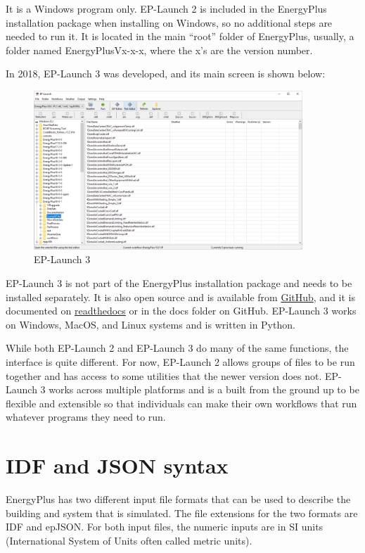It is a Windows program only. EP-Launch 2 is included in the EnergyPlus
installation package when installing on Windows, so no additional
steps are needed to run it. It is located in the main ``root'' folder
of EnergyPlus, usually, a folder named EnergyPlusVx-x-x, where the
x's are the version number. 

In 2018, EP-Launch 3 was developed, and its main screen is shown below:

\begin{figure}[hbtp] 
\centering
\includegraphics[width=0.9\textwidth, height=0.9\textheight, keepaspectratio=true]{media/eplaunch3.png}
\caption{EP-Launch 3}
\end{figure}


EP-Launch 3 is not part of the EnergyPlus installation package and
needs to be installed separately. It is also open source and is available
from \href{https://github.com/NREL/EP-Launch}{GitHub}, and it is
documented on \href{https://ep-launch.readthedocs.io/en/latest/}{readthedocs}
or in the docs folder on GitHub. EP-Launch 3 works on Windows, MacOS,
and Linux systems and is written in Python.

While both EP-Launch 2 and EP-Launch 3 do many of the same functions,
the interface is quite different. For now, EP-Launch 2 allows groups
of files to be run together and has access to some utilities that
the newer version does not. EP-Launch 3 works across multiple platforms
and is a built from the ground up to be flexible and extensible so
that individuals can make their own workflows that run whatever programs
they need to run.

\section{IDF and JSON syntax}

EnergyPlus has two different input file formats that can be used to
describe the building and system that is simulated. The file extensions
for the two formats are IDF and epJSON. For both input files, the
numeric inputs are in SI units (International System of Units often
called metric units). 

